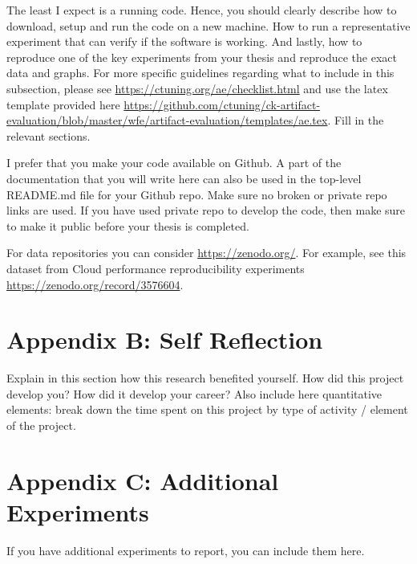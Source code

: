 \documentclass[11pt]{article}
\begin{document}
The least I expect is a running code. Hence, you should clearly describe how to download, setup and run the code on a new machine. How to run a representative experiment that can verify if the software is working. And lastly, how to reproduce one of the key experiments from your thesis and reproduce the exact data and graphs. For more specific guidelines regarding what to include in this subsection, please see \url{https://ctuning.org/ae/checklist.html} and use the latex template provided here \url{https://github.com/ctuning/ck-artifact-evaluation/blob/master/wfe/artifact-evaluation/templates/ae.tex}. Fill in the relevant sections. 

I prefer that you make your code available on Github. A part of the documentation that you will write here can also be used in the top-level README.md file for your Github repo. Make sure no broken or private repo links are used. If you have used private repo to develop the code, then make sure to make it public before your thesis is completed. 

For data repositories you can consider \url{https://zenodo.org/}. For example, see this dataset from Cloud performance reproducibility experiments \url{https://zenodo.org/record/3576604}. 

\newpage 
\section*{Appendix B: Self Reflection}
Explain in this section how this research benefited yourself. How did this project develop you? How did it develop your career? Also include here quantitative elements: break down the time spent on this project by type of activity / element of the project.

\newpage 
\section*{Appendix C: Additional Experiments}
If you have additional experiments to report, you can include them here. 

\end{document}
